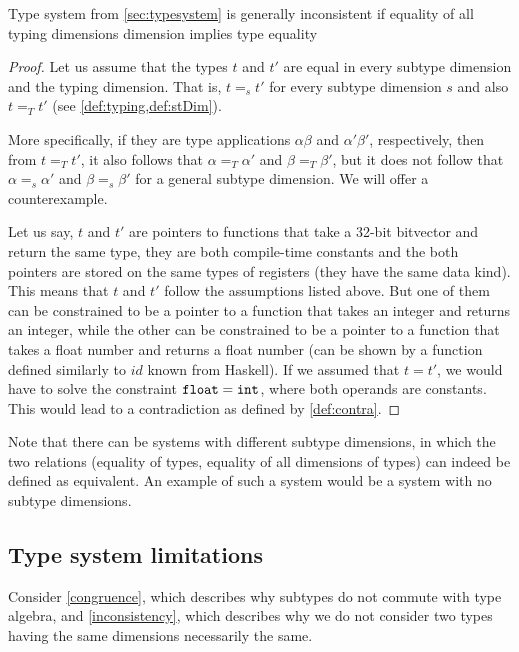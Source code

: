 \begin{lemma}Type system from \cref{sec:typesystem} is generally inconsistent if equality of all typing dimensions dimension implies type equality
    \label{inconsistency}
    \begin{proof}
        Let us assume that the types $t$ and $t'$ are equal in every subtype dimension and the typing dimension. That is, $t =_s t'$ for every subtype dimension $s$ and also $t =_T t'$ (see \cref{def:typing,def:stDim}).

        More specifically, if they are type applications $\alpha \beta$ and $\alpha' \beta'$, respectively, then from $t =_T t'$, it also follows that $\alpha =_T \alpha'$ and $\beta =_T \beta'$, but it does not follow that $\alpha =_s \alpha'$ and $\beta =_s \beta'$ for a general subtype dimension. We will offer a counterexample.

        Let us say, $t$ and $t'$ are pointers to functions that take a 32-bit bitvector and return the same type, they are both compile-time constants and the both pointers are stored on the same types of registers (they have the same data kind). This means that $t$ and $t'$ follow the assumptions listed above. But one of them can be constrained to be a pointer to a function that takes an integer and returns an integer, while the other can be constrained to be a pointer to a function that takes a float number and returns a float number (can be shown by a function defined similarly to $id$ known from Haskell). If we assumed that $t = t'$, we would have to solve the constraint $\mathtt{float} = \mathtt{int}$, where both operands are constants. This would lead to a contradiction as defined by \cref{def:contra}.
    \end{proof}
\end{lemma}

Note that there can be systems with different subtype dimensions, in which the two relations (equality of types, equality of all dimensions of types) can indeed be defined as equivalent. An example of such a system would be a system with no subtype dimensions.

\subsection{Type system limitations}
\label{sec:tsLims}

Consider \cref{congruence}, which describes why subtypes do not commute with type algebra, and \cref{inconsistency}, which describes why we do not consider two types having the same dimensions necessarily the same.

